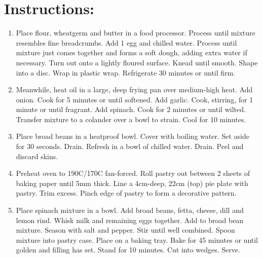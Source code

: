 \section{Instructions:}
\begin{enumerate}
\item Place flour, wheatgerm and butter in a food processor. Process until mixture resembles fine breadcrumbs. Add 1 egg and chilled water. Process until mixture just comes together and forms a soft dough, adding extra water if necessary. Turn out onto a lightly floured surface. Knead until smooth. Shape into a disc. Wrap in plastic wrap. Refrigerate 30 minutes or until firm.
\item Meanwhile, heat oil in a large, deep frying pan over medium-high heat. Add onion. Cook for 5 minutes or until softened. Add garlic. Cook, stirring, for 1 minute or until fragrant. Add spinach. Cook for 2 minutes or until wilted. Transfer mixture to a colander over a bowl to strain. Cool for 10 minutes.
\item Place broad beans in a heatproof bowl. Cover with boiling water. Set aside for 30 seconds. Drain. Refresh in a bowl of chilled water. Drain. Peel and discard skins.
\item Preheat oven to 190C/170C fan-forced. Roll pastry out between 2 sheets of baking paper until 5mm thick. Line a 4cm-deep, 22cm (top) pie plate with pastry. Trim excess. Pinch edge of pastry to form a decorative pattern.
\item Place spinach mixture in a bowl. Add broad beans, fetta, cheese, dill and lemon rind. Whisk milk and remaining eggs together. Add to broad bean mixture. Season with salt and pepper. Stir until well combined. Spoon mixture into pastry case. Place on a baking tray. Bake for 45 minutes or until golden and filling has set. Stand for 10 minutes. Cut into wedges. Serve.
\end{enumerate}
